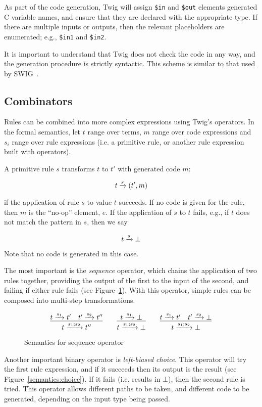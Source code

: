 As part of the code generation, Twig will assign \texttt{\$in} and
\texttt{\$out} elements generated C variable names, and ensure that they are
declared with the appropriate type. If there are multiple inputs or outputs,
then the relevant placeholders are enumerated; e.g., \texttt{\$in1} and
\texttt{\$in2}.

It is important to understand that Twig does not check the code in any way,
and the generation procedure is strictly syntactic. This scheme is similar to
that used by SWIG~\cite{swig}.

\subsection{Combinators}

Rules can be combined into more complex expressions using Twig's operators. In
the formal semantics, let $t$ range over terms, $m$ range over code
expressions and $s_i$ range over rule expressions (i.e. a primitive rule, or
another rule expression built with operators).

A primitive rule $s$ transforms $t$ to $t'$ with generated code $m$:

\[
t \xrightarrow{s} (t',m)
\]

if the application of rule $s$ to value $t$ succeeds. If no code is given for
the rule, then $m$ is the ``no-op'' element, $e$. If the application of $s$ to
$t$ fails, e.g., if $t$ does not match the pattern in $s$, then we say

\[
t \xrightarrow{s} \bot
\]

Note that no code is generated in this case.

The most important is the \emph{sequence} operator, which chains the
application of two rules together, providing the output of the first to the
input of the second, and failing if either rule fails (see
Figure~\ref{semantics:sequence}). With this operator, simple rules can be
composed into multi-step transformations.

\begin{figure}[ht]
\label{semantics:sequence}
\[
\infer{t \arr{s_1;s_2} t''}{t \arr{s_1} t' \quad t' \arr{s_2} t''}
\qquad 
\infer{t \arr{s_1;s_2} \bot}{t \arr{s_1} \bot}
\qquad
\infer{t \arr{s_1;s_2} \bot}{t \arr{s_1} t' \quad t' \arr{s_2} \bot}
\]
\caption{Semantics for sequence operator}
\end{figure}

Another important binary operator is \emph{left-biased choice}. This operator
will try the first rule expression, and if it succeeds then its output is the
result (see Figure~\ref{semantics:choice}). If it fails (i.e. results in
$\bot$), then the second rule is tried. This operator allows different paths
to be taken, and different code to be generated, depending on the input type
being passed.

